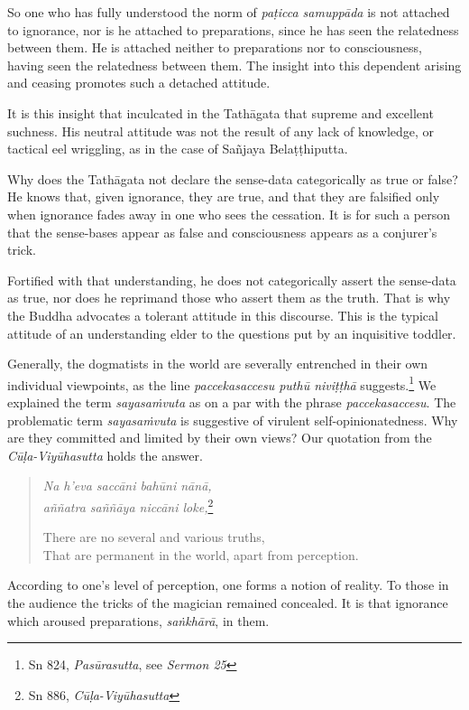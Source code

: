 So one who has fully understood the norm of \emph{paṭicca samuppāda} is not attached to ignorance, nor is he attached to preparations, since he has seen the relatedness between them. He is attached neither to preparations nor to consciousness, having seen the relatedness between them. The insight into this dependent arising and ceasing promotes such a detached attitude.

It is this insight that inculcated in the Tathāgata that supreme and excellent suchness. His neutral attitude was not the result of any lack of knowledge, or tactical eel wriggling, as in the case of Sañjaya Belaṭṭhiputta.

Why does the Tathāgata not declare the sense-data categorically as true or false? He knows that, given ignorance, they are true, and that they are falsified only when ignorance fades away in one who sees the cessation. It is for such a person that the sense-bases appear as false and consciousness appears as a conjurer's trick.

Fortified with that understanding, he does not categorically assert the sense-data as true, nor does he reprimand those who assert them as the truth. That is why the Buddha advocates a tolerant attitude in this discourse. This is the typical attitude of an understanding elder to the questions put by an inquisitive toddler.

Generally, the dogmatists in the world are severally entrenched in their own individual viewpoints, as the line \emph{paccekasaccesu puthū niviṭṭhā} suggests.\footnote{Sn 824, \emph{Pasūrasutta}, see \emph{Sermon 25}} We explained the term \emph{sayasaṁvuta} as on a par with the phrase \emph{paccekasaccesu}. The problematic term \emph{sayasaṁvuta} is suggestive of virulent self-opinionatedness. Why are they committed and limited by their own views? Our quotation from the \emph{Cūḷa-Viyūhasutta} holds the answer.

\begin{quote}
\emph{Na h'eva saccāni bahūni nānā,}\\
\emph{aññatra saññāya niccāni loke,}\footnote{Sn 886, \emph{Cūḷa-Viyūhasutta}}

There are no several and various truths,\\
That are permanent in the world, apart from perception.
\end{quote}

According to one's level of perception, one forms a notion of reality. To those in the audience the tricks of the magician remained concealed. It is that ignorance which aroused preparations, \emph{saṅkhārā}, in them.

